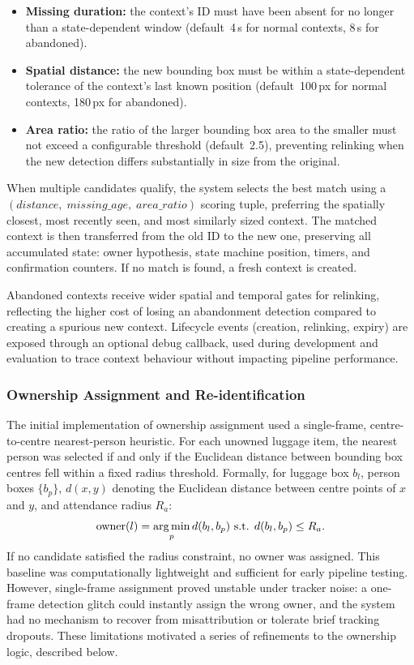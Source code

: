\begin{itemize}
	\item \textbf{Missing duration:} the context's ID must have been absent for
	      no longer than a state-dependent window (default~4\,s for normal
	      contexts, 8\,s for abandoned).
	\item \textbf{Spatial distance:} the new bounding box must be within a
	      state-dependent tolerance of the context's last known position
	      (default~100\,px for normal contexts, 180\,px for abandoned).
	\item \textbf{Area ratio:} the ratio of the larger bounding box area to the
	      smaller must not exceed a configurable threshold (default~2.5),
	      preventing relinking when the new detection differs substantially in
	      size from the original.
\end{itemize}

When multiple candidates qualify, the system selects the best match using a
$(\textit{distance},\; \textit{missing\_age},\; \textit{area\_ratio})$ scoring
tuple, preferring the spatially closest, most recently seen, and most similarly
sized context. The matched context is then transferred from the old ID to the
new one, preserving all accumulated state: owner hypothesis, state machine
position, timers, and confirmation counters. If no match is found, a fresh
context is created.

Abandoned contexts receive wider spatial and temporal gates for relinking,
reflecting the higher cost of losing an abandonment detection compared to
creating a spurious new context. Lifecycle events (creation, relinking, expiry)
are exposed through an optional debug callback, used during development and
evaluation to trace context behaviour without impacting pipeline performance.

\subsubsection{Ownership Assignment and Re-identification}
\label{sec:ownership_assignment}

The initial implementation of ownership assignment used a single-frame,
centre-to-centre nearest-person heuristic. For each unowned luggage item, the
nearest person was selected if and only if the Euclidean distance between
bounding box centres fell within a fixed radius threshold. Formally, for
luggage box $b_l$, person boxes $\{b_p\}$, $d(x, y)$ denoting the Euclidean
distance between centre points of $x$ and $y$, and attendance radius $R_a$:
\begin{align}
	\text{owner}(l) = \operatorname*{arg\,min}_p{d(b_l, b_p) \text{ s.t. } d(b_l, b_p) \leq R_a}.
\end{align}
If no candidate satisfied the radius constraint, no owner was assigned. This
baseline was computationally lightweight and sufficient for early pipeline
testing. However, single-frame assignment proved unstable under tracker noise:
a one-frame detection glitch could instantly assign the wrong owner, and the
system had no mechanism to recover from misattribution or tolerate brief
tracking dropouts. These limitations motivated a series of refinements to the
ownership logic, described below.

